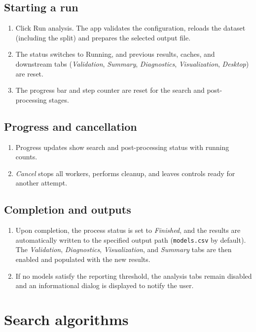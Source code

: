 \documentclass[11pt,a4paper]{article}
\begin{document}
\subsection{Starting a run}
\begin{enumerate}
  \item Click Run analysis. The app validates the configuration, reloads the dataset (including the split) and prepares the selected output file.
  \item The status switches to Running, and previous results, caches, and downstream tabs (\emph{Validation}, \emph{Summary}, \emph{Diagnostics}, \emph{Visualization}, \emph{Desktop}) are reset.
  \item The progress bar and step counter are reset for the search and post-processing stages.
\end{enumerate}

\subsection{Progress and cancellation}
\begin{enumerate}
  \item Progress updates show search and post-processing status with running counts.
  \item \emph{Cancel} stops all workers, performs cleanup, and leaves controls ready for another attempt.
\end{enumerate}

\subsection{Completion and outputs}
\begin{enumerate}
  \item Upon completion, the process status is set to \emph{Finished}, and the results are automatically written to the specified output path (\texttt{models.csv} by default). The \emph{Validation}, \emph{Diagnostics}, \emph{Visualization}, and \emph{Summary} tabs are then enabled and populated with the new results.
  \item If no models satisfy the reporting threshold, the analysis tabs remain disabled and an informational dialog is displayed to notify the user.
\end{enumerate}

\section{Search algorithms}
\end{document}
